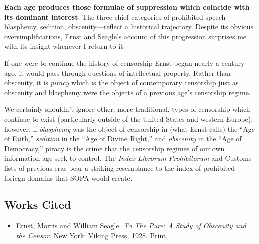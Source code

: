\documentclass[
  12pt,
]{article}
\providecommand{\tightlist}{%
  \setlength{\itemsep}{0pt}\setlength{\parskip}{0pt}}
\begin{document}
\textbf{Each age produces those formulae of suppression which coincide
with its dominant interest}. The three chief categories of prohibited
speech---blasphemy, sedition, obscenity---reflect a historical
trajectory. Despite its obvious oversimplifications, Ernst and Seagle's
account of this progression surprises me with its insight whenever I
return to it.

If one were to continue the history of censorship Ernst began nearly a
century ago, it would pass through questions of intellectual property.
Rather than obscenity, it is \emph{piracy} which is the object of
contemporary censorship just as obscenity and blasphemy were the objects
of a previous age's censorship regime.

We certainly shouldn't ignore other, more traditional, types of
censorship which continue to exist (particularly outside of the United
States and western Europe); however, if \emph{blasphemy} was the object
of censorship in (what Ernst calls) the ``Age of Faith,''
\emph{sedition} in the ``Age of Divine Right,'' and \emph{obscenity} in
the ``Age of Democracy,'' piracy is the crime that the censorship
regimes of our own information age seek to control. The \emph{Index
Librorum Prohibitorum} and Customs lists of previous eras bear a
striking resemblance to the index of prohibited foriegn domains that
SOPA would create.

\hypertarget{works-cited}{%
\subsection{Works Cited}\label{works-cited}}

\begin{itemize}
\tightlist
\item
  Ernst, Morris and William Seagle. \emph{To The Pure: A Study of
  Obscenity and the Censor}. New York: Viking Press, 1928. Print.
\end{itemize}
\end{document}
